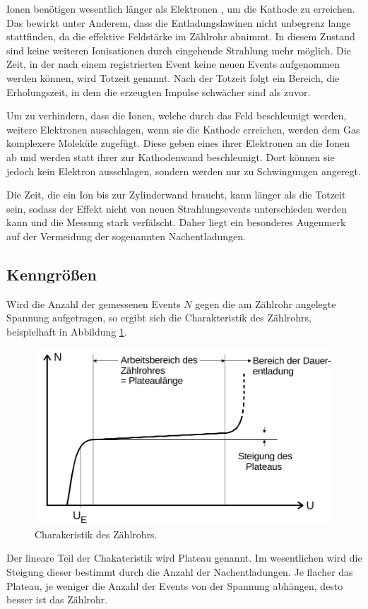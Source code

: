 Ionen benötigen wesentlich länger als Elektronen , um die Kathode zu erreichen.
Das bewirkt unter Anderem, dass die Entladungslawinen nicht unbegrenz lange stattfinden, da die effektive Feldstärke
im Zählrohr abnimmt.
In diesem Zustand sind keine weiteren Ionisationen durch eingehende Strahlung mehr möglich.
Die Zeit, in der nach einem registrierten Event keine neuen Events aufgenommen werden können, wird Totzeit genannt.
Nach der Totzeit folgt ein Bereich, die Erholungszeit, in dem die erzeugten Impulse schwächer sind als zuvor.

Um zu verhindern, dass die Ionen, welche durch das Feld beschleunigt werden, weitere Elektronen ausschlagen,
wenn sie die Kathode erreichen, werden dem Gas komplexere Moleküle zugefügt. Diese geben eines ihrer Elektronen an die Ionen ab
und werden statt ihrer zur Kathodenwand beschleunigt.
Dort können sie jedoch kein Elektron ausschlagen, sondern werden nur zu Schwingungen angeregt.

Die Zeit, die ein Ion bis zur Zylinderwand braucht, kann länger als die Totzeit sein, sodass der Effekt nicht von neuen
Strahlungsevents unterschieden werden kann und die Messung stark verfälscht.
Daher liegt ein besonderes Augenmerk auf der Vermeidung der sogenannten Nachentladungen.

\subsection{Kenngrößen}
Wird die Anzahl der gemessenen Events $N$ gegen die am Zählrohr angelegte Spannung aufgetragen, so ergibt sich die Charakteristik
des Zählrohrs, beispielhaft in Abbildung \ref{fig:plateau}.
\begin{figure}[H]
  \centering
  \includegraphics[width=\textwidth]{content/plateau.png}
  \caption{Charakeristik des Zählrohrs.\cite{v703}}
  \label{fig:plateau}
\end{figure}
Der lineare Teil der Chakateristik wird Plateau genannt.
Im wesentlichen wird die Steigung dieser bestimmt durch die Anzahl der Nachentladungen.
Je flacher das Plateau, je weniger die Anzahl der Events von der Spannung abhängen, desto besser ist das Zählrohr.

